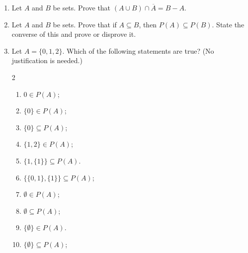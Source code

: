 \begin{enumerate}
\item Let $A$ and $B$ be sets. Prove that $(A \cup B) \cap \overline{A} = B - A$.

\item Let $A$ and $B$ be sets. Prove that if $A \subseteq B$, then $P(A) \subseteq P(B)$. State the converse of this and prove or disprove it.    
\item Let $A = \{0,1,2\}$. Which of the following statements are true? (No justification is needed.)

\begin{multicols}{2}  
 \begin{enumerate}
 \item $0 \in P(A)$;\vspace{0.3cm}
 \item $\{0\} \in P(A)$;\vspace{0.3cm}      
 \item $\{0\} \subseteq P(A)$;\vspace{0.3cm}   
 \item $\{1,2\} \in P(A)$;\vspace{0.3cm}
 \item $\{1,\{1\}\} \subseteq P(A)$.\\ 
 \item $\{\{0,1\},\{1\}\} \subseteq P(A)$;\vspace{0.3cm}
 \item $\emptyset \in P(A)$;\vspace{0.3cm}
 \item $\emptyset \subseteq P(A)$;\vspace{0.3cm}
 \item $\{\emptyset\} \in P(A)$. \vspace{0.3cm}
 \item $\{\emptyset\} \subseteq P(A)$;\vspace{0.3cm}

 \end{enumerate}
\end{multicols}
\end{enumerate}

